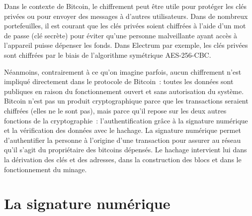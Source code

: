 Dans le contexte de Bitcoin, le chiffrement peut être utile pour protéger les clés privées ou pour envoyer des messages à d'autres utilisateurs. Dans de nombreux portefeuilles, il est courant que les clés privées soient chiffrées à l'aide d'un mot de passe (clé secrète) pour éviter qu'une personne malveillante ayant accès à l'appareil puisse dépenser les fonds. Dans Electrum par exemple, les clés privées sont chiffrées par le biais de l'algorithme symétrique AES-256-CBC.

Néanmoins, contrairement à ce qu'on imagine parfois, aucun chiffrement n'est impliqué directement dans le protocole de Bitcoin~: toutes les données sont publiques en raison du fonctionnement ouvert et sans autorisation du système. Bitcoin n'est pas un produit cryptographique parce que les transactions seraient chiffrées (elles ne le sont pas), mais parce qu'il repose sur les deux autres fonctions de la cryptographie~: l'authentification grâce à la signature numérique et la vérification des données avec le hachage. La signature numérique permet d'authentifier la personne à l'origine d'une transaction pour assurer au réseau qu'il s'agit du propriétaire des bitcoins dépensés. Le hachage intervient lui dans la dérivation des clés et des adresses, dans la construction des blocs et dans le fonctionnement du minage.

\section*{La signature numérique}

%

